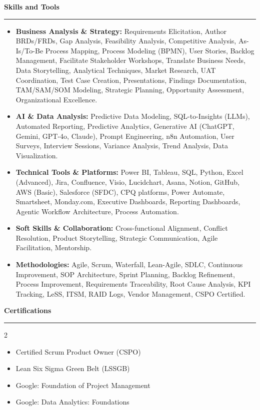 \documentclass[9pt,letterpaper]{article} %
\newenvironment{rSection}[1]{ %
  \sectionskip
 \textbf{\Large #1} %
  \sectionlineskip
  \hrule %
  \begin{list}{}{ %
    \setlength{\leftmargin}{-0em} %
  }
  \item[]
}{
  \end{list}
}
\def\sectionlineskip{\smallskip} %
\def\sectionskip{} %
\begin{document}
\begin{rSection}{Skills and Tools}
\begin{itemize}[left=-1.5em, labelsep=.1cm, labelwidth=.2cm, itemsep=0.0em, topsep=0pt]
\item \textbf{Business Analysis \& Strategy:} Requirements Elicitation, Author BRDs/FRDs, Gap Analysis, Feasibility Analysis, Competitive Analysis, As-Is/To-Be Process Mapping, Process Modeling (BPMN), User Stories, Backlog Management, Facilitate Stakeholder Workshops, Translate Business Needs, Data Storytelling, Analytical Techniques, Market Research, UAT Coordination, Test Case Creation, Presentations, Findings Documentation, TAM/SAM/SOM Modeling, Strategic Planning, Opportunity Assessment, Organizational Excellence.
\item \textbf{AI \& Data Analysis:} Predictive Data Modeling, SQL-to-Insights (LLMs), Automated Reporting, Predictive Analytics, Generative AI (ChatGPT, Gemini, GPT-4o, Claude), Prompt Engineering, n8n Automation, User Surveys, Interview Sessions, Variance Analysis, Trend Analysis, Data Visualization.
\item \textbf{Technical Tools \& Platforms:} Power BI, Tableau, SQL, Python, Excel (Advanced), Jira, Confluence, Visio, Lucidchart, Asana, Notion, GitHub, AWS (Basic), Salesforce (SFDC), CPQ platforms, Power Automate, Smartsheet, Monday.com, Executive Dashboards, Reporting Dashboards, Agentic Workflow Architecture, Process Automation.
\item \textbf{Soft Skills \& Collaboration:} Cross-functional Alignment, Conflict Resolution, Product Storytelling, Strategic Communication, Agile Facilitation, Mentorship.
\item \textbf{Methodologies:} Agile, Scrum, Waterfall, Lean-Agile, SDLC, Continuous Improvement, SOP Architecture, Sprint Planning, Backlog Refinement, Process Improvement, Requirements Traceability, Root Cause Analysis, KPI Tracking, LeSS, ITSM, RAID Logs, Vendor Management, CSPO Certified.
\end{itemize}
\end{rSection}%
\begin{rSection}{Certifications}
\begin{multicols}{2}
\begin{itemize}[left=-1.5em, labelsep=.1cm, labelwidth=.2cm, itemsep=0.0em, topsep=0pt]
\item Certified Scrum Product Owner (CSPO)
\item Lean Six Sigma Green Belt (LSSGB)
\item Google: Foundation of Project Management
\item Google: Data Analytics: Foundations
\end{itemize}
\end{multicols}
\end{rSection}
\end{document}
